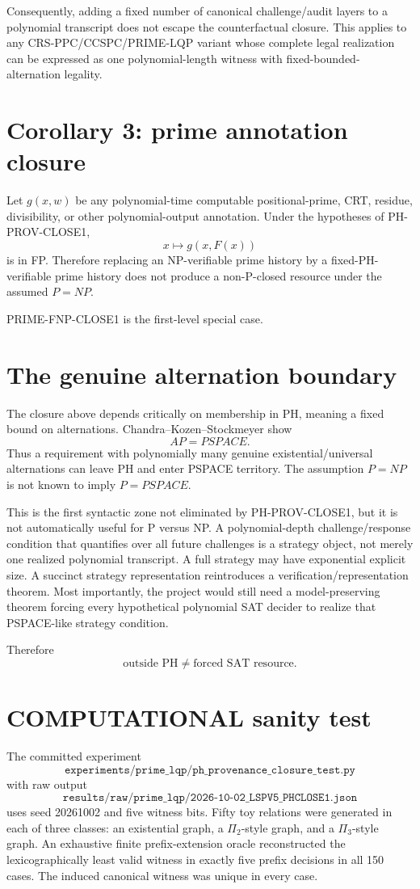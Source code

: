 \documentclass[11pt]{article}
\begin{document}
Consequently, adding a fixed number of canonical challenge/audit layers to a polynomial transcript
does not escape the counterfactual closure. This applies to any CRS-PPC/CCSPC/PRIME-LQP variant
whose complete legal realization can be expressed as one polynomial-length witness with
fixed-bounded-alternation legality.

\section*{Corollary 3: prime annotation closure}
Let \(g(x,w)\) be any polynomial-time computable positional-prime, CRT, residue, divisibility, or
other polynomial-output annotation. Under the hypotheses of PH-PROV-CLOSE1,
\[
x\mapsto g(x,F(x))
\]
is in FP. Therefore replacing an NP-verifiable prime history by a fixed-PH-verifiable prime history
does not produce a non-P-closed resource under the assumed \(P=NP\).

PRIME-FNP-CLOSE1 is the first-level special case.

\section*{The genuine alternation boundary}
The closure above depends critically on membership in PH, meaning a fixed bound on alternations.
Chandra--Kozen--Stockmeyer show
\[
\boxed{AP=PSPACE.}
\]
Thus a requirement with polynomially many genuine existential/universal alternations can leave PH
and enter PSPACE territory. The assumption \(P=NP\) is not known to imply \(P=PSPACE\).

This is the first syntactic zone not eliminated by PH-PROV-CLOSE1, but it is not automatically
useful for P versus NP. A polynomial-depth challenge/response condition that quantifies over all
future challenges is a strategy object, not merely one realized polynomial transcript. A full
strategy may have exponential explicit size. A succinct strategy representation reintroduces a
verification/representation theorem. Most importantly, the project would still need a
model-preserving theorem forcing every hypothetical polynomial SAT decider to realize that
PSPACE-like strategy condition.

Therefore
\[
\boxed{\text{outside PH}\neq\text{forced SAT resource}.}
\]

\section*{COMPUTATIONAL sanity test}
The committed experiment
\[
\texttt{experiments/prime\_lqp/ph\_provenance\_closure\_test.py}
\]
with raw output
\[
\texttt{results/raw/prime\_lqp/2026-10-02\_LSPV5\_PHCLOSE1.json}
\]
uses seed 20261002 and five witness bits. Fifty toy relations were generated in each of three
classes: an existential graph, a \(\Pi_2\)-style graph, and a \(\Pi_3\)-style graph. An exhaustive
finite prefix-extension oracle reconstructed the lexicographically least valid witness in exactly
five prefix decisions in all 150 cases. The induced canonical witness was unique in every case.
\end{document}
